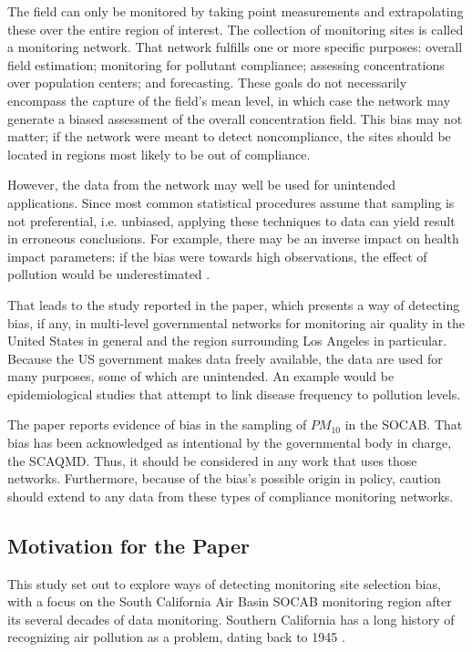 \documentclass{article}
\begin{document}
	The field can only be monitored by taking point measurements and extrapolating these over the entire region of interest. The collection of monitoring sites is called a monitoring network.  That network fulfills one or more specific purposes: overall field estimation; monitoring for pollutant compliance; assessing concentrations over population centers; and forecasting.  These goals do not necessarily encompass the capture of the field's mean level, in which case the network may generate a biased assessment of the overall concentration field. This bias may not matter; if the network were meant to detect noncompliance, the sites should be located in regions most likely to be out of compliance. 
	
	However, the data from the network may well be used for unintended applications. Since most common statistical procedures assume that sampling is not preferential, i.e. unbiased, 
	applying these techniques to data can yield result in erroneous conclusions.  For example, there may 
	be an inverse impact on health impact parameters: if the bias were towards high observations, the effect of pollution would be underestimated \citep{Zidek:2012}.
	
	
	That leads to the study reported in the paper, which presents a way of detecting bias, if any,
	in multi-level governmental networks for monitoring air quality in the United States in general and the region surrounding Los Angeles in particular.  Because the US government makes data freely available, the data are used for many purposes, some of which are unintended. An example would be epidemiological studies that attempt to link disease frequency to pollution levels.
	
	The paper reports evidence of bias in the sampling of $PM_{10}$ in the \ac{SOCAB}.  That bias has been acknowledged as intentional by the governmental body in charge, the \ac{SCAQMD}.  Thus, it should be considered in any work that uses those networks. Furthermore, because of the bias's possible origin in policy, caution should extend to any data from these types of compliance monitoring networks.
	
	\subsection{Motivation for the Paper}
	\label{subsec:motivation}
	This study set out to explore ways of detecting monitoring site selection bias, with a focus on the South California Air Basin SOCAB monitoring region after its several decades of data monitoring.  Southern California has a long history of recognizing air pollution as a problem, dating back to 1945 \citep{CASCAQMD:2015}.
	
\end{document}
